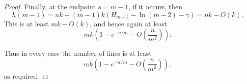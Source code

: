 \documentclass[10pt,a4paper]{amsart}
\begin{document}
\begin{proof}
    Finally, at the endpoint $s=m-1$, if it occurs, then
    \[
    h(m-1)
    =
    nk-(m-1)k\left(H_{m-1}-\ln(m-2)-\gamma\right)
    =
    nk-O(k).
    \]
    This is at least $mk-O(k)$, and hence again at least
    \[
    mk\left(1-e^{-n/m}-O\left(\frac{n}{m^2}\right)\right).
    \]

    Thus in every case the number of lines is at least
    \[
    mk\left(1-e^{-n/m}-O\left(\frac{n}{m^2}\right)\right),
    \]
    as required.
\end{proof}
\end{document}
